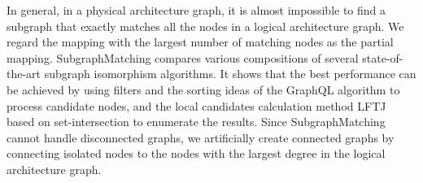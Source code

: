 \documentclass[journal]{IEEEtran}
\begin{document}
In general, in a physical architecture graph, it is almost impossible to find a subgraph that exactly matches all the nodes in a logical architecture graph. We regard the mapping with the largest number of matching nodes as the partial mapping. SubgraphMatching compares various compositions of several state-of-the-art subgraph isomorphism algorithms.  
It shows that the best performance can be achieved by using filters and the sorting ideas of the GraphQL algorithm to process candidate nodes, and the local candidates calculation method LFTJ based on set-intersection to enumerate the results. Since SubgraphMatching cannot handle disconnected graphs, we artificially create connected graphs by connecting isolated nodes to the nodes with the largest degree in the logical architecture graph. %
\end{document}
